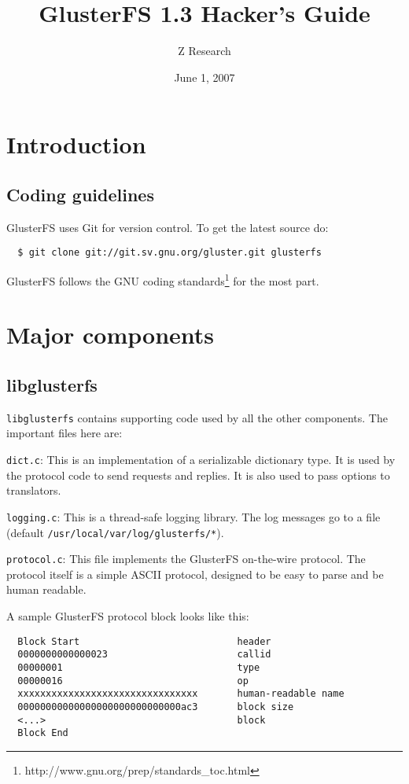 \documentclass{book}[12pt]
\begin{document}

\author{Z Research}
\title{GlusterFS 1.3 Hacker's Guide}
\date{June 1, 2007}

\maketitle
\frontmatter
\tableofcontents

\mainmatter
\chapter{Introduction}

\section{Coding guidelines}
GlusterFS uses Git for version control. To get the latest source do:
\begin{verbatim}
  $ git clone git://git.sv.gnu.org/gluster.git glusterfs
\end{verbatim}
\noindent
GlusterFS follows the GNU coding
standards\footnote{http://www.gnu.org/prep/standards\_toc.html} for the
most part.

\chapter{Major components}
\section{libglusterfs}
\texttt{libglusterfs} contains supporting code used by all the other components. 
The important files here are:

\texttt{dict.c}: This is an implementation of a serializable dictionary type. It is
used by the protocol code to send requests and replies. It is also used to pass options
to translators.

\texttt{logging.c}: This is a thread-safe logging library. The log messages go to a
file (default \texttt{/usr/local/var/log/glusterfs/*}).

\texttt{protocol.c}: This file implements the GlusterFS on-the-wire
protocol. The protocol itself is a simple ASCII protocol, designed to
be easy to parse and be human readable.

A sample GlusterFS protocol block looks like this:
\begin{verbatim}
  Block Start                            header
  0000000000000023                       callid
  00000001                               type
  00000016                               op
  xxxxxxxxxxxxxxxxxxxxxxxxxxxxxxxx       human-readable name
  00000000000000000000000000000ac3       block size
  <...>                                  block
  Block End
\end{verbatim}
\end{document}
